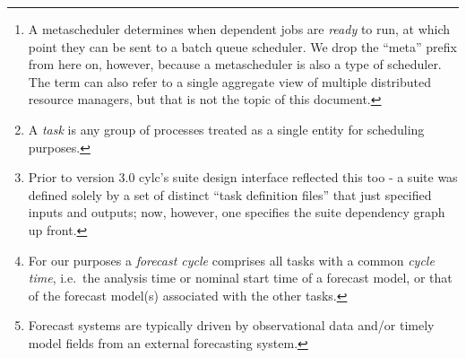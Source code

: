 \begin{abstract}

    {\em Cylc} (pronounced ``silk'') is an advanced
    metascheduler\footnote{A metascheduler determines when dependent
    jobs are {\em ready} to run, at which point they can be sent to a
    batch queue scheduler. We drop the ``meta'' prefix from here on,
    however, because a metascheduler is also a type of scheduler. The
    term can also refer to a single aggregate view of multiple
    distributed resource managers, but that is not the topic of this
    document.} for cycling environmental forecast suites containing many
    interdependent scientific models and associated data processing
    tasks.\footnote{A {\em task} is any group of processes treated as a
    single entity for scheduling purposes.} Cylc is internally
    self-organising:\footnote{Prior to version 3.0 cylc's suite design
    interface reflected this too - a suite was defined solely by a set
    of distinct ``task definition files'' that just specified inputs and
    outputs; now, however, one specifies the suite dependency graph up
    front.} its novel scheduling algorithm allows an evolving pool of
    task proxy objects to resolve dependencies amongst themselves so
    that correct scheduling emerges naturally at run time.  Cylc does
    not group tasks artificially by forecast cycle,\footnote{For our
    purposes a {\em forecast cycle} comprises all tasks with a common
    {\em cycle time}, i.e.\ the analysis time or nominal start time of a
    forecast model, or that of the forecast model(s) associated with the
    other tasks.} and its task proxies are individually self-spawning
    (i.e.\ there is no ``global suite forecast cycle'') so that tasks
    from multiple forecast cycles can run at once to the full extent
    allowed by the real inter- and intra-cycle dependencies. This
    matters in particular whenever the external driving
    data\footnote{Forecast systems are typically driven by observational
    data and/or timely model fields from an external forecasting
    system.} for upcoming cycles are available in advance: cylc suites
    can catch up from delays very quickly, parallel test suites can be
    started or restarted behind the main operation to catch up quickly,
    and one can likewise achieve much greater throughput in historical
    case studies. The usual sequence of distinct forecast cycles emerges
    naturally as a suite catches up to real time operation.  Cylc is
    easily interfaced to existing tasks and is extremely flexible.
    Suites can be stopped and restarted in any state of operation, and

\end{abstract}
